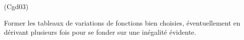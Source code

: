 \begin{tiny}(Cgd03)\end{tiny} Former les tableaux de variations de fonctions bien choisies, éventuellement en dérivant plusieurs fois pour se fonder sur une inégalité évidente. 